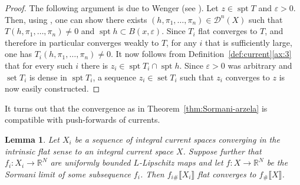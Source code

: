 \documentclass[reqno]{amsart}
\newtheorem{lemma}[theorem]{Lemma}
\numberwithin{equation}{section}
\newcommand{\R}{\mathbb{R}}
\newcommand{\spt}{\operatorname{spt}}
\newcommand{\bb}[1]{\llbracket #1\rrbracket}
\DeclareMathOperator{\set}{set}
\begin{document}
\begin{proof}
The following argument is due to Wenger (see \cite[Proposition 2.2]{wenger-2011}). 
Let \(z\in \spt T\) and \(\varepsilon >0\). Then, using \cite[Proposition 2.7]{amb00}, one can show there exists \((h, \pi_1, \dots, \pi_n)\in \mathcal{D}^n(X)\) such that \(T(h, \pi_1, \dots, \pi_n)\neq 0\) and \(\spt h \subset B(x, \varepsilon)\). Since \(T_i\) flat converges to \(T\), and therefore in particular converges weakly to \(T\), for any \(i\) that is sufficiently large, one has \(T_i(h, \pi_1, \dots, \pi_n)\neq 0\). It now follows from  Definition~\ref{def:current}\eqref{ax:3} that for every such \(i\) there is \(z_i\in \spt T_i \cap \spt h\). Since \(\varepsilon >0\) was arbitrary and $\set T_i$ is dense in $\spt T_i$, a sequence \(z_i\in \set T_i\) such that \(z_i\) converges to \(z\) is now easily constructed. 
\end{proof}
It turns out that the convergence as in Theorem~\ref{thm:Sormani-arzela} is compatible with push-forwards of currents.
\begin{lemma}\label{lem:functorality-arzela-ascoli}
Let \(X_i\) be a sequence of integral current spaces converging in the intrinsic flat sense to an integral current space \(X\). Suppose further that \(f_i \colon X_i \to \R^N\) are uniformly bounded \(L\)-Lipschitz maps and let \(f\colon X\to \R^N\) be the Sormani limit of some subsequence \(f_{i}\). Then \(f_{i\#} \bb{X_{i}}\) flat converges to \(f_\# \bb{X}\). 
\end{lemma}
\end{document}

